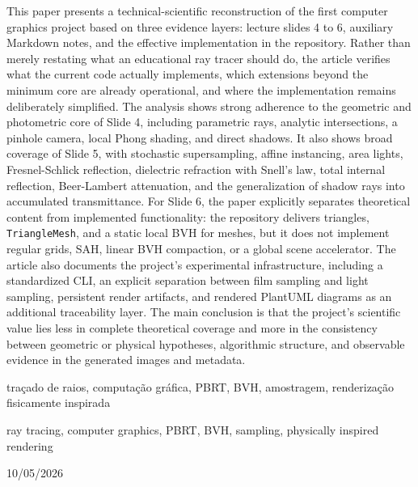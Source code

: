 \documentclass[portuguese]{sbcreviews-2025}%
\begin{document}
\begin{frontmatter}
\begin{abstract-en}
This paper presents a technical-scientific reconstruction of the first computer graphics project based on three evidence layers: lecture slides 4 to 6, auxiliary Markdown notes, and the effective implementation in the  repository. Rather than merely restating what an educational ray tracer should do, the article verifies what the current code actually implements, which extensions beyond the minimum core are already operational, and where the implementation remains deliberately simplified. The analysis shows strong adherence to the geometric and photometric core of Slide 4, including parametric rays, analytic intersections, a pinhole camera, local Phong shading, and direct shadows. It also shows broad coverage of Slide 5, with stochastic supersampling, affine instancing, area lights, Fresnel-Schlick reflection, dielectric refraction with Snell's law, total internal reflection, Beer-Lambert attenuation, and the generalization of shadow rays into accumulated transmittance. For Slide 6, the paper explicitly separates theoretical content from implemented functionality: the repository delivers triangles, \texttt{TriangleMesh}, and a static local BVH for meshes, but it does not implement regular grids, SAH, linear BVH compaction, or a global scene accelerator. The article also documents the project's experimental infrastructure, including a standardized CLI, an explicit separation between film sampling and light sampling, persistent render artifacts, and rendered PlantUML diagrams as an additional traceability layer. The main conclusion is that the project's scientific value lies less in complete theoretical coverage and more in the consistency between geometric or physical hypotheses, algorithmic structure, and observable evidence in the generated images and metadata.
\end{abstract-en}

\begin{pchaves}
traçado de raios, computação gráfica, PBRT, BVH, amostragem, renderização fisicamente inspirada
\end{pchaves}

\begin{keywords}
ray tracing, computer graphics, PBRT, BVH, sampling, physically inspired rendering
\end{keywords}

\begin{dates}
 10/05/2026
\end{dates}

\end{frontmatter}
\end{document}
